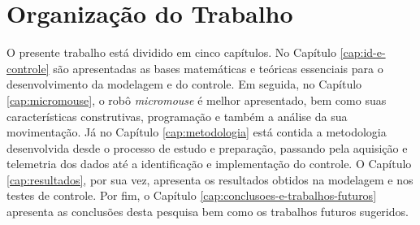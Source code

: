    \section{Organização do Trabalho} \label{sec:organização}

        O presente trabalho está dividido em cinco capítulos. No Capítulo \ref{cap:id-e-controle} são apresentadas as bases matemáticas e teóricas essenciais para o desenvolvimento da modelagem e do controle. Em seguida, no Capítulo \ref{cap:micromouse}, o robô \textit{micromouse} é melhor apresentado, bem como suas características construtivas, programação e também a análise da sua movimentação. Já no Capítulo \ref{cap:metodologia} está contida a metodologia desenvolvida desde o processo de estudo e preparação, passando pela aquisição e telemetria dos dados até a identificação e implementação do controle. O Capítulo \ref{cap:resultados}, por sua vez, apresenta os resultados obtidos na modelagem e nos testes de controle. Por fim, o Capítulo \ref{cap:conclusoes-e-trabalhos-futuros} apresenta as conclusões desta pesquisa bem como os trabalhos futuros sugeridos.


	

	
